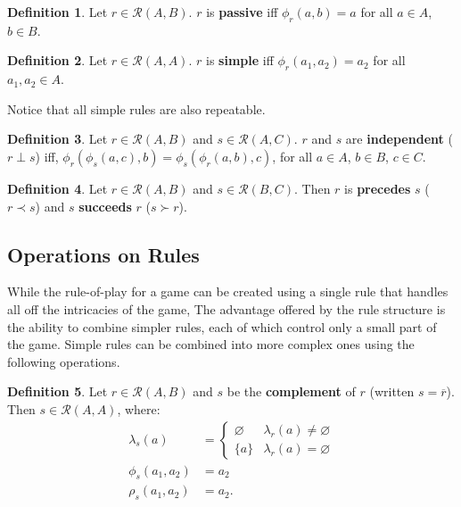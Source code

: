 \documentclass{article}
\theoremstyle{definition}
\newtheorem{definition}{Definition}[subsection]
\theoremstyle{plain}
\def\rule{\mathcal{R}}
\begin{document}
\begin{definition}
  Let $ r \in \rule (A, B) $. $ r $ is \textbf{passive} iff $ \phi_r (a, b) = a $ for all $ a \in A $, $ b \in B $.
\end{definition}

\begin{definition}
  Let $ r \in \rule (A, A) $. $ r $ is \textbf{simple} iff $ \phi_r (a_1, a_2) = a_2 $ for all $ a_1, a_2 \in A $.
\end{definition}

Notice that all simple rules are also repeatable.

\begin{definition}
  Let $ r \in \rule (A, B) $
  and $ s \in \rule (A, C) $.
  $r$ and $s$ are \textbf{independent} ($ r \perp s $) iff,
  $ \phi_r (\phi_s (a, c), b) = \phi_s (\phi_r (a, b), c) $, 
  for all $ a \in A $, $ b \in B $, $ c \in C $.
\end{definition}

\begin{definition}
  Let $ r \in \rule (A, B) $ and $ s \in \rule (B, C) $.
  Then $ r $ is \textbf{precedes} $ s $
  ($ r \prec s $)
  and $ s $ \textbf{succeeds} $ r $
  ($ s \succ r $).
\end{definition}

\subsection{Operations on Rules} %

While the rule-of-play for a game can be created using a single rule
that handles all off the intricacies of the game,
The advantage offered by the rule structure
is the ability to combine simpler rules,
each of which control only a small part of the game.
Simple rules can be combined into more complex ones using the following operations.

\begin{definition}
  Let $ r \in \rule (A, B) $
  and $ s $ be the \textbf{complement} of $ r $
  (written $ s = \overline{r} $).
  Then $ s \in \rule (A, A) $, where:
  \begin{align}
    \lambda_s (a)    & = \begin{cases}
                           \varnothing & \lambda_r (a) \neq \varnothing \\
                           \{ a \}     & \lambda_r (a) = \varnothing
                         \end{cases} \\
       \phi_s (a_1, a_2) & = a_2 \\
       \rho_s (a_1, a_2) & = a_2.
  \end{align}
\end{definition}
\end{document}
